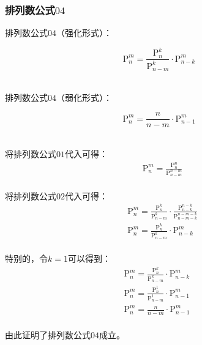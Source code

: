 \documentclass[UTF8]{ctexart}
\newcommand{\Pe}{\mathrm{P}}
\begin{document}
\subsubsection{排列数公式$04$}
    排列数公式$04$（强化形式）：
    \begin{large}
        \begin{equation*}
            \Pe_n^m=\frac{\Pe_n^k}{\Pe_{n-m}^k}\cdot\Pe_{n-k}^{m}
        \end{equation*}
    \end{large}\\
    排列数公式$04$（弱化形式）：
    \begin{large}
        \begin{equation*}
            \Pe_n^m=\frac{n}{n-m}\cdot\Pe_{n-1}^{m}
        \end{equation*}
    \end{large}\\
    将排列数公式$01$代入可得：
    \setcounter{equation}{0}
    \begin{align}
        &\Pe_n^m=\frac{\Pe_n^n}{\Pe_{n-m}^{n-m}}
    \end{align}\\
    将排列数公式$02$代入可得：
    \begin{align}
        &\Pe_n^m=\frac{\Pe_n^k}{\Pe_{n-m}^k}\cdot\frac{\Pe_{n-k}^{n-k}}{\Pe_{n-m-k}^{n-m-k}}\\[3mm]
        &\Pe_n^m=\frac{\Pe_n^k}{\Pe_{n-m}^k}\cdot\Pe_{n-k}^{m}
    \end{align}\\
    特别的，令$k=1$可以得到：
    \begin{align}
        &\Pe_n^m=\frac{\Pe_n^k}{\Pe_{n-m}^k}\cdot\Pe_{n-k}^{m}~~~~~~\\[3mm]
        &\Pe_n^m=\frac{\Pe_n^1}{\Pe_{n-m}^1}\cdot\Pe_{n-1}^{m}\\[3mm]
        &\Pe_n^m=\frac{n}{n-m}\cdot\Pe_{n-1}^{m}
    \end{align}\\
    由此证明了排列数公式$04$成立。

\newpage
\end{document}

